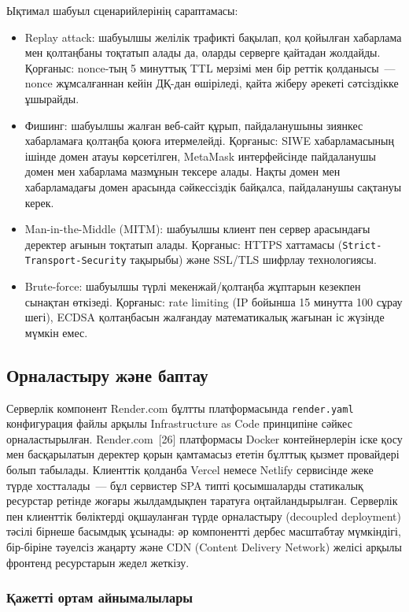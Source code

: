 \documentclass[14pt,a4paper]{extarticle}
\begin{document}
Ықтимал шабуыл сценарийлерінің сараптамасы:
\begin{itemize}[nosep]
\item Replay attack: шабуылшы желілік трафикті бақылап, қол қойылған хабарлама мен қолтаңбаны тоқтатып алады да, оларды серверге қайтадан жолдайды. Қорғаныс: nonce-тың 5 минуттық TTL мерзімі мен бір реттік қолданысы~--- nonce жұмсалғаннан кейін ДҚ-дан өшіріледі, қайта жіберу әрекеті сәтсіздікке ұшырайды.
\item Фишинг: шабуылшы жалған веб-сайт құрып, пайдаланушыны зиянкес хабарламаға қолтаңба қоюға итермелейді. Қорғаныс: SIWE хабарламасының ішінде домен атауы көрсетілген, MetaMask интерфейсінде пайдаланушы домен мен хабарлама мазмұнын тексере алады. Нақты домен мен хабарламадағы домен арасында сәйкессіздік байқалса, пайдаланушы сақтануы керек.
\item Man-in-the-Middle (MITM): шабуылшы клиент пен сервер арасындағы деректер ағынын тоқтатып алады. Қорғаныс: HTTPS хаттамасы (\texttt{Strict-Transport-Security} тақырыбы) және SSL/TLS шифрлау технологиясы.
\item Brute-force: шабуылшы түрлі мекенжай/қолтаңба жұптарын кезекпен сынақтан өткізеді. Қорғаныс: rate limiting (IP бойынша 15 минутта 100 сұрау шегі), ECDSA қолтаңбасын жалғандау математикалық жағынан іс жүзінде мүмкін емес.
\end{itemize}

\subsection{Орналастыру және баптау}

Серверлік компонент Render.com бұлтты платформасында \texttt{render.yaml} конфигурация файлы арқылы Infrastructure as Code принципіне сәйкес орналастырылған. Render.com~[26] платформасы Docker контейнерлерін іске қосу мен басқарылатын деректер қорын қамтамасыз ететін бұлттық қызмет провайдері болып табылады. Клиенттік қолданба Vercel немесе Netlify сервисінде жеке түрде хостталады~--- бұл сервистер SPA типті қосымшаларды статикалық ресурстар ретінде жоғары жылдамдықпен таратуға оңтайландырылған. Серверлік пен клиенттік бөліктерді оқшауланған түрде орналастыру (decoupled deployment) тәсілі бірнеше басымдық ұсынады: әр компонентті дербес масштабтау мүмкіндігі, бір-біріне тәуелсіз жаңарту және CDN (Content Delivery Network) желісі арқылы фронтенд ресурстарын жедел жеткізу.

\subsubsection{Қажетті ортам айнымалылары}
\end{document}
